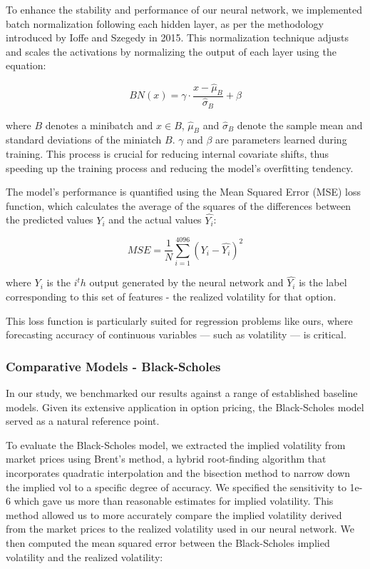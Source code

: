 \documentclass[10pt]{article}
\begin{document}
To enhance the stability and performance of our neural network, we implemented batch normalization following each hidden layer, as per the methodology introduced by Ioffe and Szegedy in 2015\cite{ioffe2015batch}. This normalization technique adjusts and scales the activations by normalizing the output of each layer using the equation:

\begin{equation}
    BN(x) = \gamma\cdot \frac{x - \hat{\mu}_B}{\hat{\sigma}_B} + \beta
\end{equation}

where \(B\) denotes a minibatch and \(x \in B\), \(\hat{\mu}_B\) and \(\hat{\sigma}_B\) denote the sample mean and standard deviations of the miniatch \(B\). \(\gamma\) and \(\beta\) are parameters learned during training. This process is crucial for reducing internal covariate shifts, thus speeding up the training process and reducing the model's overfitting tendency.

The model's performance is quantified using the Mean Squared Error (MSE) loss function, which calculates the average of the squares of the differences between the predicted values \(Y_i\) and the actual values \(\hat{Y_i}\):

\begin{equation}
    MSE = \frac{1}{N}\sum_{i=1}^{4096}(Y_i - \hat{Y_i})^2
\end{equation}

where \(Y_i\) is the \(i^th\) output generated by the neural network and \(\hat{Y_i}\) is the label corresponding to this set of features - the realized volatility for that option.

This loss function is particularly suited for regression problems like ours, where forecasting accuracy of continuous variables — such as volatility — is critical\cite{hodson2022root}.

\subsubsection{Comparative Models - Black-Scholes}
In our study, we benchmarked our results against a range of established baseline models. Given its extensive application in option pricing, the Black-Scholes model served as a natural reference point.

To evaluate the Black-Scholes model, we extracted the implied volatility from market prices using Brent's method, a hybrid root-finding algorithm that incorporates quadratic interpolation and the bisection method to narrow down the implied vol to a specific degree of accuracy\cite{brent1973some}. We specified the sensitivity to 1e-6 which gave us more than reasonable estimates for implied volatility. This method allowed us to more accurately compare the implied volatility derived from the market prices to the realized volatility used in our neural network. We then computed the mean squared error between the Black-Scholes implied volatility and the realized volatility:
\end{document}
